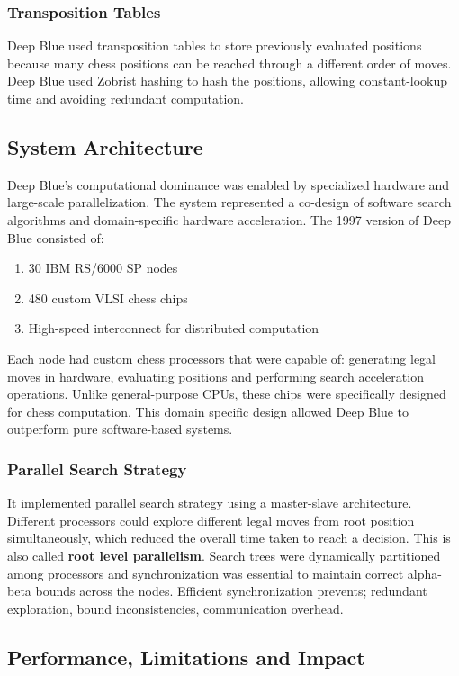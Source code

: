 \documentclass[11pt,a4paper]{report}
\begin{document}
\subsubsection{Transposition Tables}
Deep Blue used transposition tables to store previously evaluated positions because many chess positions can be reached through a different order of
moves. Deep Blue used Zobrist hashing to hash the positions, allowing constant-lookup time and avoiding redundant computation.

\subsection{System Architecture}
Deep Blue’s computational dominance was enabled by specialized hardware and large-scale parallelization.
The system represented a co-design of software search algorithms and domain-specific hardware acceleration.
The 1997 version of Deep Blue consisted of:
\begin{enumerate}
    \item 30 IBM RS/6000 SP nodes
    \item 480 custom VLSI chess chips
    \item High-speed interconnect for distributed computation
\end{enumerate}

Each node had custom chess processors that were capable of: generating legal moves in hardware, evaluating positions and performing search
acceleration operations. Unlike general-purpose CPUs, these chips were specifically designed for chess computation. This domain specific
design allowed Deep Blue to outperform pure software-based systems.

\subsubsection{Parallel Search Strategy}
It implemented parallel search strategy using a master-slave architecture. Different processors could explore different legal
moves from root position simultaneously, which reduced the overall time taken to reach a decision. This is also called \textbf{root level
parallelism}. Search trees were dynamically partitioned among processors and synchronization was essential to maintain correct alpha-beta
bounds across the nodes. Efficient synchronization prevents; redundant exploration, bound inconsistencies, communication overhead.

\subsection{Performance, Limitations and Impact}
\end{document}
